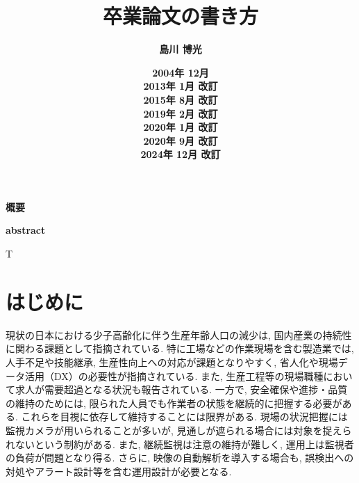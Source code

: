 \documentclass[a4paper,12pt]{jreport}
\title{{\Huge {\bf 卒業論文の書き方}}}
\author{{\LARGE {\bf 島川 博光}}}
\date{{\Large {\bf 2004年 12月}\\
              {\bf 2013年 1月 改訂}\\
              {\bf 2015年 8月 改訂}\\
              {\bf 2019年 2月 改訂}\\
              {\bf 2020年 1月 改訂}\\
              {\bf 2020年 9月 改訂}\\
              {\bf 2024年 12月 改訂}
	      }}
\begin{document}
\setlength{\baselineskip}{8mm}


\maketitle





\begin{center}


\vspace{10mm}

{\Large {\bf 概要}}
\end{center}



\clearpage


\begin{center}


\vspace{10mm}

{\Large {\bf abstract}}
\end{center}


T

\clearpage


\tableofcontents

\clearpage
{}
\listoffigures
\clearpage
{}
\listoftables


\clearpage
{}

\chapter{はじめに}
現状の日本における少子高齢化に伴う生産年齢人口の減少は, 国内産業の持続性に関わる課題として指摘されている. 特に工場などの作業現場を含む製造業では, 人手不足や技能継承, 生産性向上への対応が課題となりやすく, 省人化や現場データ活用（DX）の必要性が指摘されている. また, 生産工程等の現場職種において求人が需要超過となる状況も報告されている.
一方で, 安全確保や進捗・品質の維持のためには, 限られた人員でも作業者の状態を継続的に把握する必要がある. これらを目視に依存して維持することには限界がある. 現場の状況把握には監視カメラが用いられることが多いが, 見通しが遮られる場合には対象を捉えられないという制約がある. また, 継続監視は注意の維持が難しく, 運用上は監視者の負荷が問題となり得る. さらに, 映像の自動解析を導入する場合も, 誤検出への対処やアラート設計等を含む運用設計が必要となる.
\end{document}
